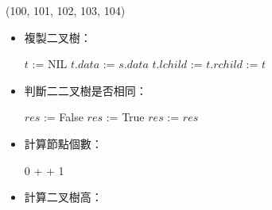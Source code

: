 \item \begin{theorem}{(100, 101, 102, 103, 104)} \quad\quad \begin{itemize}
        \item 複製二叉樹：\begin{algorithm}[H]
            \begin{algorithmic}[1]
                        \State $t$ := NIL
                    \Else 
                        \State $t.data$ := $s.data$
                        \State $t.lchild$ := 
                        \State $t.rchild$ := 
                    \EndIf
                    \State \Return $t$
                \EndFunction
            \end{algorithmic}
        \end{algorithm}
        \item 判斷二二叉樹是否相同：\begin{algorithm}[H]
            \begin{algorithmic}[1]
                    \State $res$ := False
                        \State $res$ := True
                                \State $res$ := 
                            \EndIf
                        \EndIf
                    \EndIf
                    \State \Return $res$
                \EndFunction
            \end{algorithmic}
        \end{algorithm}
        \item 計算節點個數：\begin{algorithm}[H]
            \begin{algorithmic}[1]
                        \State \Return $0$
                    \Else
                        \State \Return {} +  + 1
                    \EndIf
                \EndFunction
            \end{algorithmic}
        \end{algorithm}
        \item 計算二叉樹高：\begin{algorithm}[H]

\end{algorithm}
\end{itemize}
\end{theorem}

